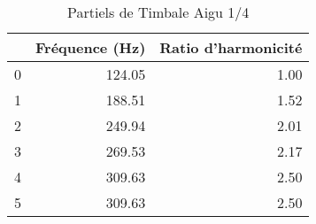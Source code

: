 \begin{table}
\centering
\caption{Partiels de Timbale Aigu 1/4}
\label{table:partiels-timbale-aigu-1.wav}
\begin{tabular}{lrr}
\toprule
{} &  Fréquence (Hz) &  Ratio d'harmonicité \\
\midrule
0 &          124.05 &                 1.00 \\
1 &          188.51 &                 1.52 \\
2 &          249.94 &                 2.01 \\
3 &          269.53 &                 2.17 \\
4 &          309.63 &                 2.50 \\
5 &          309.63 &                 2.50 \\
\bottomrule
\end{tabular}
\end{table}
